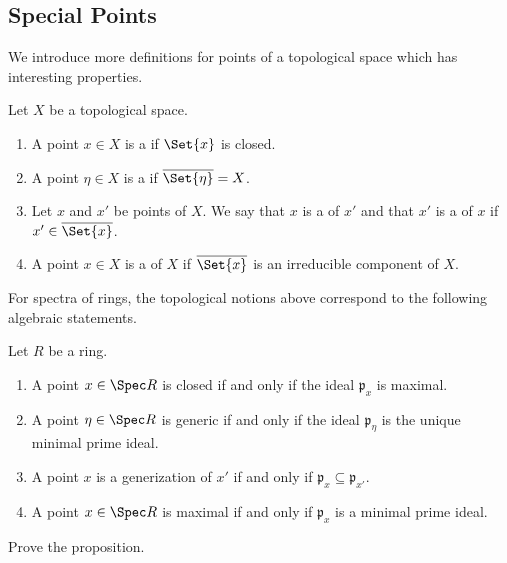 \subsection*{Special Points}

We introduce more definitions for points of a topological space which has interesting properties.

\begin{definition}
	Let $X$ be a topological space.
	\begin{enumerate}
		\item A point $x \in X$ is a  if $\Set{x}$ is closed.
		\item A point $\eta \in X$ is a  if $\overline{\Set{\eta} }= X$.
		
		\item Let $x$ and $x'$ be points of $X$. We say that $x$ is a  of $x'$ and that $x'$ is a  of $x$ if $x' \in \overline{\Set{x}}$.
		
		\item A point $x \in X$ is a  of $X$ if $\overline{\Set{x}}$ is an irreducible component of $X$.
	\end{enumerate}
\end{definition}

For spectra of rings, the topological notions above correspond to the following algebraic statements.

\begin{proposition}\label{chap2:spacial-points-of-rings} Let $R$ be a ring.
	\begin{enumerate}
		\item A point $x \in \Spec R$ is closed if and only if the ideal $\mathfrak{p}_x$ is maximal.
		
		\item A point $\eta \in \Spec R$ is generic if and only if the ideal $\mathfrak{p}_{\eta}$ is the unique minimal prime ideal.
		
		\item A point $x$ is a generization of $x'$ if and only if $\mathfrak{p}_x \subseteq \mathfrak{p}_{x'}$.
		
		\item A point $x \in \Spec R$ is maximal if and only if $\mathfrak{p}_x$ is a minimal prime ideal.
	\end{enumerate}
\end{proposition}

\begin{exercise}
	Prove the proposition.
\end{exercise}

